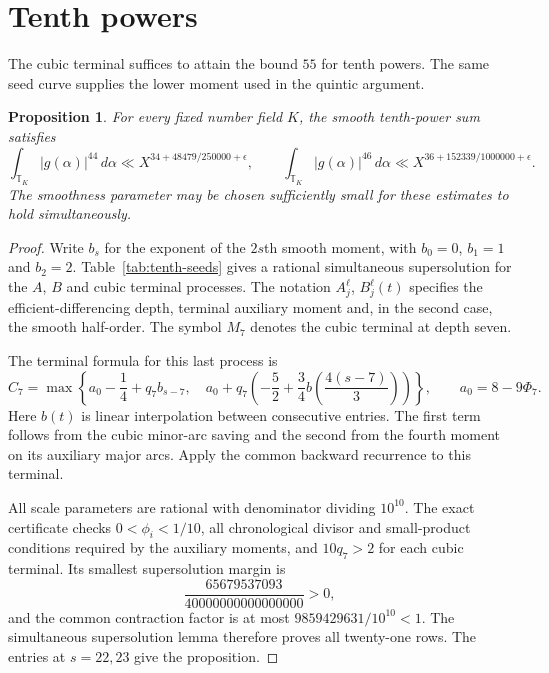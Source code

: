 \documentclass[11pt]{amsart}
\newtheorem{proposition}[theorem]{Proposition}
\theoremstyle{definition}
\numberwithin{equation}{section}
\begin{document}
\section{Tenth powers}
\label{sec:tenth-powers}
The cubic terminal suffices to attain the bound $55$ for tenth powers.
The same seed curve supplies the lower moment used in the quintic argument.

\begin{proposition}\label{prop:tenth-moments}
For every fixed number field $K$, the smooth tenth-power sum satisfies
\[
 \int_{\mathbb T_K}|g(\alpha)|^{44}\,d\alpha
 \ll X^{34+48479/250000+\epsilon},\qquad
 \int_{\mathbb T_K}|g(\alpha)|^{46}\,d\alpha
 \ll X^{36+152339/1000000+\epsilon}.
\]
The smoothness parameter may be chosen sufficiently small for these
estimates to hold simultaneously.
\end{proposition}
\begin{proof}
Write $b_s$ for the exponent of the $2s$th smooth moment, with
$b_0=0$, $b_1=1$ and $b_2=2$. Table~\ref{tab:tenth-seeds} gives a
rational simultaneous supersolution for the $A$, $B$ and cubic terminal
processes. The notation $A_j^\ell$, $B_j^\ell(t)$ specifies the
 efficient-differencing depth, terminal auxiliary moment and, in the
second case, the smooth half-order. The symbol $M_7$ denotes the cubic
terminal at depth seven.

The terminal formula for this last process is
\begin{equation}\label{eq:tenth-cubic-terminal}
 C_7=\max\left\{
 a_0-\frac14+q_7b_{s-7},\quad
 a_0+q_7\left(-\frac52+\frac34b\left(\frac{4(s-7)}3\right)\right)
 \right\},\qquad a_0=8-9\Phi_7.
\end{equation}
Here $b(t)$ is linear interpolation between consecutive entries.
The first term follows from the cubic minor-arc saving and the second
from the fourth moment on its auxiliary major arcs. Apply the common
backward recurrence to this terminal.

All scale parameters are rational with denominator dividing $10^{10}$.
The exact certificate checks $0<\phi_i<1/10$, all chronological divisor
and small-product conditions required by the auxiliary moments, and
$10q_7>2$ for each cubic terminal. Its smallest supersolution margin is
\[
 \frac{65679537093}{40000000000000000}>0,
\]
and the common contraction factor is at most
$9859429631/10^{10}<1$. The simultaneous supersolution lemma therefore
proves all twenty-one rows. The entries at $s=22,23$ give the proposition.
\end{proof}
\end{document}
